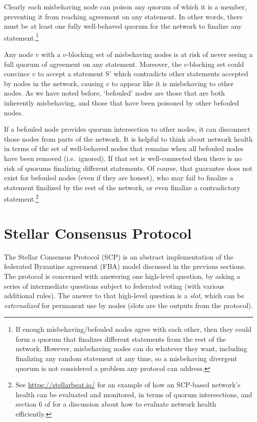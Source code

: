 Clearly each misbehaving node can poison any quorum of which it is a member, preventing it from reaching agreement on any statement. In other words, there must be at least one fully well-behaved quorum for the network to finalize any statement.\footnote{If enough misbehaving/befouled nodes agree with each other, then they could form a quorum that finalizes different statements from the rest of the network. However, misbehaving nodes can do whatever they want, including finalizing any random statement at any time, so a misbehaving divergent quorum is not considered a problem any protocol can address.}

Any node $v$ with a $v$-blocking set of misbehaving nodes is at risk of never seeing a full quorum of agreement on any statement. Moreover, the $v$-blocking set could convince $v$ to accept a statement S' which contradicts other statements accepted by nodes in the network, causing $v$ to appear like it is misbehaving to other nodes. As we have noted before, `befouled' nodes are those that are both inherently misbehaving, and those that have been poisoned by other befouled nodes.

If a befouled node provides quorum intersection to other nodes, it can disconnect those nodes from parts of the network. It is helpful to think about network health in terms of the set of well-behaved nodes that remains when all befouled nodes have been removed (i.e.\ ignored). If that set is well-connected then there is no risk of quorums finalizing different statements. Of course, that guarantee does not exist for befouled nodes (even if they are honest), who may fail to finalize a statement finalized by the rest of the network, or even finalize a contradictory statement.\footnote{See \url{https://stellarbeat.io/} for an example of how an SCP-based network's health can be evaluated and monitored, in terms of quorum intersections, and section 6 of \cite{fast-secure-global-payments-stellar} for a discussion about how to evaluate network health efficiently.}



\section{Stellar Consensus Protocol}
\label{sec:consensus-stellar-consensus-protocol}

The Stellar Consensus Protocol (SCP) is an abstract implementation of the federated Byzantine agreement (FBA) model discussed in the previous sections. The protocol is concerned with answering one high-level question, by asking a series of intermediate questions subject to federated voting (with various additional rules). The answer to that high-level question is a {\em slot}, which can be {\em externalized} for permanent use by nodes (slots are the outputs from the protocol).

